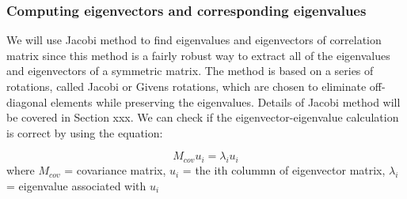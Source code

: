 \documentclass[12pt,twoside]{article}
\begin{document}
\subsubsection*{Computing eigenvectors and corresponding eigenvalues}
\bigbreak
We will use Jacobi method to find eigenvalues and eigenvectors of correlation matrix since this method is a fairly robust way to extract all of the eigenvalues and eigenvectors of a symmetric matrix. The method is based on a series of rotations, called Jacobi or Givens rotations, which are chosen to eliminate off-diagonal elements while preserving the eigenvalues. Details of Jacobi method will be covered in Section xxx.
\bigbreak
We can check if the eigenvector-eigenvalue calculation is correct by using the equation:

$$M_{cov} u_i = \lambda_i u_i$$ where
\newline$M_{cov}$ = covariance matrix, 
\newline$u_i$ = the ith colummn of eigenvector matrix, 
\newline$\lambda_i$ = eigenvalue associated with $u_i$

\bigbreak
\end{document}
